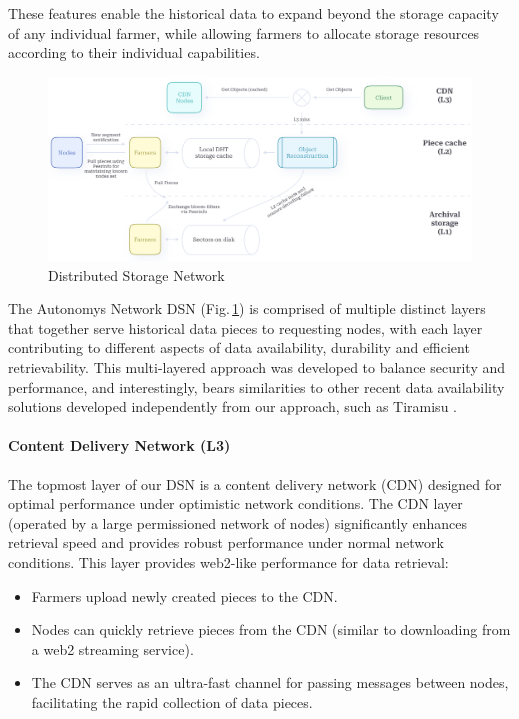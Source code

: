 \documentclass[conference]{IEEEtran}
\begin{document}
These features enable the historical data to expand beyond the storage capacity of any individual farmer, while allowing farmers to allocate storage resources according to their individual capabilities.
\begin{figure}
    \centering
    \includegraphics[width=1
\linewidth]{cache-layers.png}
\caption{Distributed Storage Network}
\label{fig:dsn}
\end{figure}

The Autonomys Network DSN (Fig.\,\ref{fig:dsn}) is comprised of multiple distinct layers that together serve historical data pieces to requesting nodes, with each layer contributing to different aspects of data availability, durability and efficient retrievability. This multi-layered approach was developed to balance security and performance, and interestingly, bears similarities to other recent data availability solutions developed independently from our approach, such as Tiramisu \cite{espresso}.

\paragraph{Content Delivery Network (L3)}

The topmost layer of our DSN is a content delivery network (CDN) designed for optimal performance under optimistic network conditions. The CDN layer (operated by a large permissioned network of nodes) significantly enhances retrieval speed and provides robust performance under normal network conditions. This layer provides web2-like performance for data retrieval:

\begin{itemize}
    \item Farmers upload newly created pieces to the CDN.
    \item Nodes can quickly retrieve pieces from the CDN (similar to downloading from a web2 streaming service).
    \item The CDN serves as an ultra-fast channel for passing messages between nodes, facilitating the rapid collection of data pieces.
\end{itemize}
\end{document}
